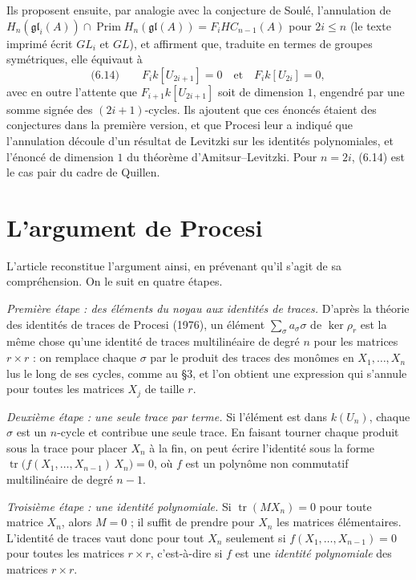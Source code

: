 \documentclass[11pt,a4paper]{amsart}
\theoremstyle{definition}
\theoremstyle{plain}
\theoremstyle{remark}
\newcommand{\gl}{\mathfrak{gl}}
\newcommand{\Prim}{\operatorname{Prim}}
\newcommand{\tr}{\operatorname{tr}}
\begin{document}
Ils proposent ensuite, par analogie avec la conjecture de Soulé, l'annulation de $H_n(\gl_i(A)) \cap \Prim H_n(\gl(A)) = F_i HC_{n-1}(A)$ pour $2i \le n$ (le texte imprimé écrit $GL_i$ et $GL$), et affirment que, traduite en termes de groupes symétriques, elle équivaut à
\[
\text{(6.14)} \qquad F_i k[U_{2i+1}] = 0 \quad\text{et}\quad F_i k[U_{2i}] = 0,
\]
avec en outre l'attente que $F_{i+1} k[U_{2i+1}]$ soit de dimension $1$, engendré par une somme signée des $(2i+1)$-cycles. Ils ajoutent que ces énoncés étaient des conjectures dans la première version, et que Procesi leur a indiqué que l'annulation découle d'un résultat de Levitzki sur les identités polynomiales, et l'énoncé de dimension $1$ du théorème d'Amitsur--Levitzki. Pour $n = 2i$, (6.14) est le cas pair du cadre de Quillen.

\section{L'argument de Procesi}

L'article reconstitue l'argument ainsi, en prévenant qu'il s'agit de sa compréhension. On le suit en quatre étapes.

\emph{Première étape : des éléments du noyau aux identités de traces.} D'après la théorie des identités de traces de Procesi (1976), un élément $\sum_\sigma a_\sigma \sigma$ de $\ker \rho_r$ est la même chose qu'une identité de traces multilinéaire de degré $n$ pour les matrices $r \times r$ : on remplace chaque $\sigma$ par le produit des traces des monômes en $X_1, \dots, X_n$ lus le long de ses cycles, comme au \S3, et l'on obtient une expression qui s'annule pour toutes les matrices $X_j$ de taille $r$.

\emph{Deuxième étape : une seule trace par terme.} Si l'élément est dans $k(U_n)$, chaque $\sigma$ est un $n$-cycle et contribue une seule trace. En faisant tourner chaque produit sous la trace pour placer $X_n$ à la fin, on peut écrire l'identité sous la forme $\tr\bigl(f(X_1, \dots, X_{n-1})\, X_n\bigr) = 0$, où $f$ est un polynôme non commutatif multilinéaire de degré $n-1$.

\emph{Troisième étape : une identité polynomiale.} Si $\tr(M X_n) = 0$ pour toute matrice $X_n$, alors $M = 0$ ; il suffit de prendre pour $X_n$ les matrices élémentaires. L'identité de traces vaut donc pour tout $X_n$ seulement si $f(X_1, \dots, X_{n-1}) = 0$ pour toutes les matrices $r \times r$, c'est-à-dire si $f$ est une \emph{identité polynomiale} des matrices $r \times r$.
\end{document}
